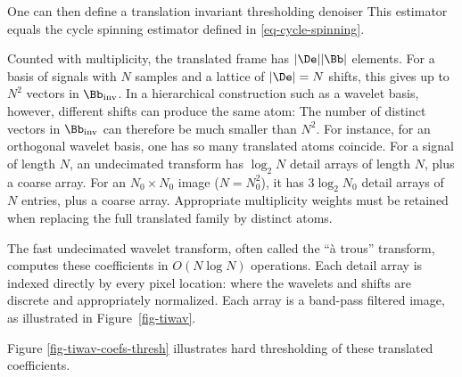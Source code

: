 One can then define a translation invariant thresholding denoiser
This estimator equals the cycle spinning estimator defined in \eqref{eq-cycle-spinning}.

Counted with multiplicity, the translated frame has $|\De| |\Bb|$ elements.
For a basis of signals with $N$ samples and a lattice of $|\De|=N$ shifts, this gives up to $N^2$ vectors in $\Bb_{\text{inv}}$. In a hierarchical construction such as a wavelet basis, however, different shifts can produce the same atom:
The number of distinct vectors in $\Bb_{\text{inv}}$ can therefore be much smaller than $N^2$.
For instance, for an orthogonal wavelet basis, one has
so many translated atoms coincide. For a signal of length $N$, an undecimated transform has $\log_2N$ detail arrays of length $N$, plus a coarse array. For an $N_0\times N_0$ image ($N=N_0^2$), it has $3\log_2N_0$ detail arrays of $N$ entries, plus a coarse array. Appropriate multiplicity weights must be retained when replacing the full translated family by distinct atoms.

The fast undecimated wavelet transform, often called the ``\`a trous'' transform, computes these coefficients in $O(N\log N)$ operations. Each detail array is indexed directly by every pixel location:
where the wavelets and shifts are discrete and appropriately normalized. Each array is a band-pass filtered image, as illustrated in Figure~\ref{fig-tiwav}.


Figure \ref{fig-tiwav-coefs-thresh} illustrates hard thresholding of these translated coefficients.

